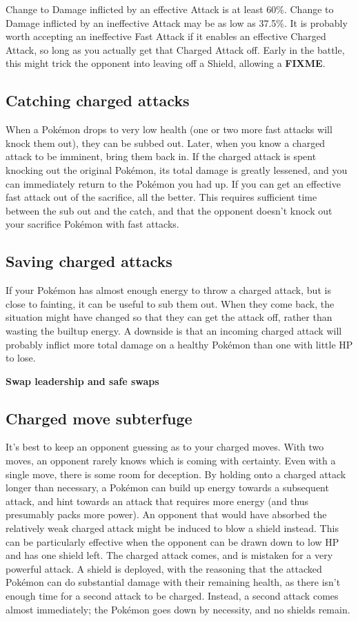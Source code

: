 Change to Damage inflicted by an effective Attack is at least 60\%.
Change to Damage inflicted by an ineffective Attack may be as
 low as 37.5\%.
It is probably worth accepting an ineffective Fast Attack if it
 enables an effective Charged Attack, so long as you actually
 get that Charged Attack off.
Early in the battle, this might trick the opponent into leaving
 off a Shield, allowing a \textbf{FIXME}.

\subsection{Catching charged attacks}
When a Pokémon drops to very low health (one or two more fast attacks will knock
 them out), they can be subbed out.
Later, when you know a charged attack to be imminent, bring them back in.
If the charged attack is spent knocking out the original Pokémon, its total
 damage is greatly lessened, and you can immediately return to the Pokémon
 you had up.
If you can get an effective fast attack out of the sacrifice, all the better.
This requires sufficient time between the sub out and the catch, and that the
 opponent doesn't knock out your sacrifice Pokémon with fast attacks.

\subsection{Saving charged attacks}
If your Pokémon has almost enough energy to throw a charged attack, but is close to fainting, it can be useful to sub them out.
When they come back, the situation might have changed so that they can get the attack off,
 rather than wasting the builtup energy.
A downside is that an incoming charged attack will probably inflict more total
 damage on a healthy Pokémon than one with little HP to lose.

\textbf{Swap leadership and safe swaps}

\subsection{Charged move subterfuge}
It's best to keep an opponent guessing as to your charged moves.
With two moves, an opponent rarely knows which is coming with certainty.
Even with a single move, there is some room for deception.
By holding onto a charged attack longer than necessary, a Pokémon can build
  up energy towards a subsequent attack, and hint towards an attack
  that requires more energy (and thus presumably packs more power).
An opponent that would have absorbed the relatively weak charged attack
  might be induced to blow a shield instead.
This can be particularly effective when the opponent can be drawn down to low HP
  and has one shield left.
The charged attack comes, and is mistaken for a very powerful attack.
A shield is deployed, with the reasoning that the attacked Pokémon can
  do substantial damage with their remaining health, as there isn't
  enough time for a second attack to be charged.
Instead, a second attack comes almost immediately; the Pokémon goes
  down by necessity, and no shields remain.

